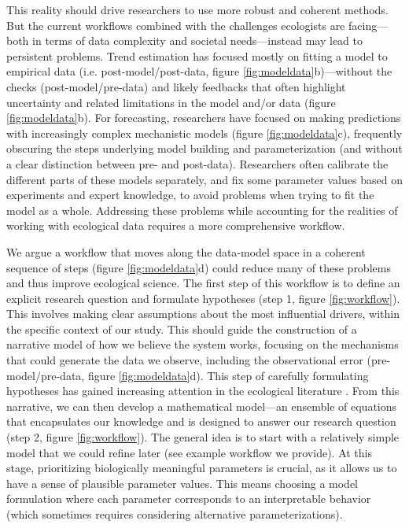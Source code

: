 \documentclass[11pt]{article}
\newcommand{\llabel}[1]{\hypertarget{lintarget:#1}{}\linelabel{lin:#1}}
\begin{document}
This reality should drive researchers to use more robust and coherent methods. But the current workflows combined with the challenges ecologists are facing---both in terms of data complexity and societal needs---instead may lead to persistent problems.
Trend estimation has focused mostly on fitting a model to empirical data (\llabel{quad1}i.e. post-model/post-data, figure \ref{fig:modeldata}b)---without the checks (\llabel{quad2}post-model/pre-data) and likely feedbacks that often highlight uncertainty and related limitations in the model and/or data (figure \ref{fig:modeldata}b). For forecasting, researchers have focused on making predictions with increasingly complex mechanistic models (figure \ref{fig:modeldata}c), frequently obscuring the steps underlying model building and parameterization (\llabel{quad3}and without a clear distinction between pre- and post-data). Researchers often calibrate the different parts of these models separately, and fix some parameter values based on experiments and expert knowledge, to avoid problems when trying to fit the model as a whole.
Addressing these problems while accounting for the realities of working with ecological data requires a more comprehensive workflow.

We argue a workflow that moves \llabel{quad4}along the data-model space in a coherent sequence of steps (figure \ref{fig:modeldata}d) could reduce many of these problems and thus improve ecological science.
The first step of this workflow is to define an explicit research question and formulate hypotheses (step 1, figure \ref{fig:workflow}). This involves making clear assumptions about the most influential drivers, within the specific context of our study. This should guide the construction of a narrative model of how we believe the system works, focusing on the mechanisms that could generate the data we observe, including the observational error (\llabel{quad5}pre-model/pre-data, figure \ref{fig:modeldata}d).  
\llabel{causalinf}This step of carefully formulating hypotheses has gained increasing attention in the ecological literature \citep{Grace2020}. From this narrative, we can then develop a mathematical model---an ensemble of equations that encapsulates our knowledge and is designed to answer our research question (step 2, figure \ref{fig:workflow}). The general idea is to start with a relatively simple model that we could refine later (see example workflow we provide). At this stage, prioritizing biologically meaningful parameters is crucial, as it allows us to have a sense of plausible parameter values. This means choosing a model formulation where each parameter corresponds to an interpretable behavior (which sometimes requires considering alternative parameterizations). 
\end{document}
